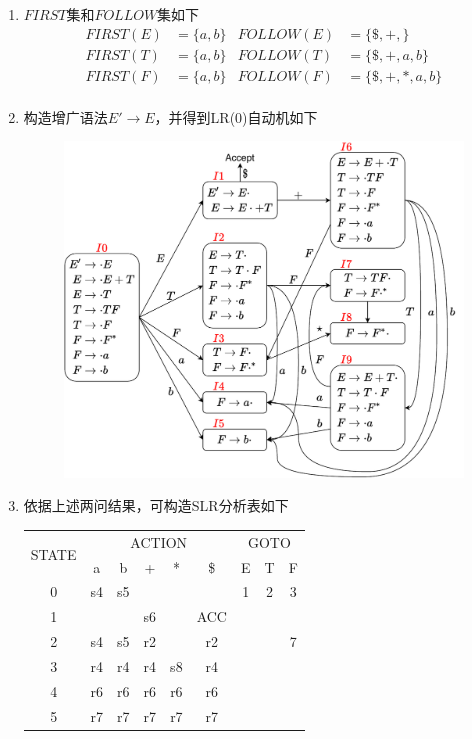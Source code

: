 \documentclass[logo,reportComp]{thesis}
\begin{document}
\begin{answer}
\begin{enumerate}
	\item $FIRST$集和$FOLLOW$集如下
	\[\begin{array}{rlrl}
	FIRST(E) &= \{a,b\} & FOLLOW(E) &=\{\$,+,\}\\
	FIRST(T) &= \{a,b\} & FOLLOW(T) &=\{\$,+,a,b\}\\
	FIRST(F) &= \{a,b\} & FOLLOW(F) &=\{\$,+,*,a,b\}\\
	\end{array}\]
	\item 构造增广语法$E'\to E$，并得到LR(0)自动机如下
	\begin{figure}[H]
	\centering
	\includegraphics[width=0.8\linewidth]{fig/T06.pdf}
	\end{figure}
	\item 依据上述两问结果，可构造SLR分析表如下
	\begin{center}
	\begin{tabular}{|c|ccccc|ccc|}\hline
	\multirow{2}{*}{STATE} & \multicolumn{5}{c|}{ACTION} & \multicolumn{3}{c|}{GOTO}\\\cline{2-9}
	  & a  & b  & +  & *  & \$  & E & T & F \\\hline
	0 & s4 & s5 &    &    &     & 1 & 2 & 3 \\\hline
	1 &    &    & s6 &    & ACC &   &   &   \\\hline
	2 & s4 & s5 & r2 &    & r2  &   &   & 7 \\\hline
	3 & r4 & r4 & r4 & s8 & r4  &   &   &   \\\hline
	4 & r6 & r6 & r6 & r6 & r6  &   &   &   \\\hline
	5 & r7 & r7 & r7 & r7 & r7  &   &   &   \\\hline

\end{tabular}
\end{center}
\end{enumerate}
\end{answer}
\end{document}
